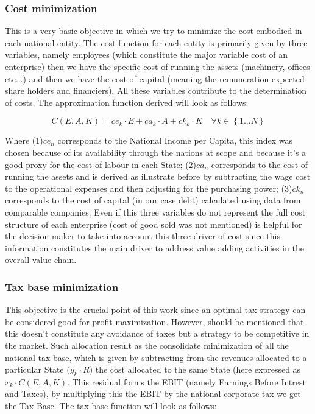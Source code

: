 \documentclass{article}
\begin{document}
\subsubsection{Cost minimization}
This is a very basic objective in which we try to minimize the cost embodied in each national entity. The cost function for each entity is primarily given by three variables, namely employees (which constitute the major variable cost of an enterprise) then we have the specific cost of running the assets (machinery, offices etc...) and then we have the cost of capital (meaning the remuneration expected share holders and financiers). All these variables contribute to the determination of costs. The approximation function derived will look as follows:

\[
C(E,A,K)=ce_k\cdot E+ca_k\cdot A+ck_k\cdot K \quad \forall k \in \left\{1...N\right\}
\]

Where (1)$ce_n$ corresponds to the National Income per Capita, this index was chosen because of its availability through the nations at scope and because it's a good proxy for the cost of labour in each State; (2)$ca_n$ corresponds to the cost of running the assets and is derived as illustrate before by subtracting the wage cost to the operational expenses and then adjusting for the purchasing power; (3)$ck_n$ corresponds to the cost of capital (in our case debt) calculated using data from comparable companies.
Even if this three variables do not represent the full cost structure of each enterprise (cost of good sold was not mentioned) is helpful for the decision maker to take into account this three driver of cost since this information constitutes the main driver to address value adding activities in the overall value chain.

\subsubsection{Tax base minimization}
This objective is the crucial point of this work since an optimal tax strategy can be considered good for profit maximization. However, should be mentioned that this doesn't constitute any avoidance of taxes but a strategy to be competitive in the market. Such allocation result as the consolidate minimization of all the national tax base, which is given by subtracting from the revenues allocated to a particular State ($y_k \cdot R$) the cost allocated to the same State (here expressed as $x_k \cdot C(E, A,K)$. This residual forms the EBIT (namely Earnings Before Intrest and Taxes), by multiplying this the EBIT by the national corporate tax we get the Tax Base. The tax base function will look as follows:
\end{document}
